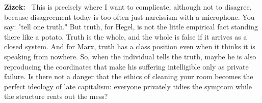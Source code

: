 \documentclass[a4paper,11pt]{article}
\newenvironment{question}{\par\noindent\color{ALIUSRed}\textbf{Zizek:}\ }{\par}
\begin{document}
\begin{question}
This is precisely where I want to complicate, although not to disagree, because disagreement today is too often just narcissism with a microphone. You say: "tell one truth." But truth, for Hegel, is not the little empirical fact standing there like a potato. Truth is the whole, and the whole is false if it arrives as a closed system. And for Marx, truth has a class position even when it thinks it is speaking from nowhere. So, when the individual tells the truth, maybe he is also reproducing the coordinates that make his suffering intelligible only as private failure. Is there not a danger that the ethics of cleaning your room becomes the perfect ideology of late capitalism: everyone privately tidies the symptom while the structure rents out the mess?
\end{question}
\end{document}

